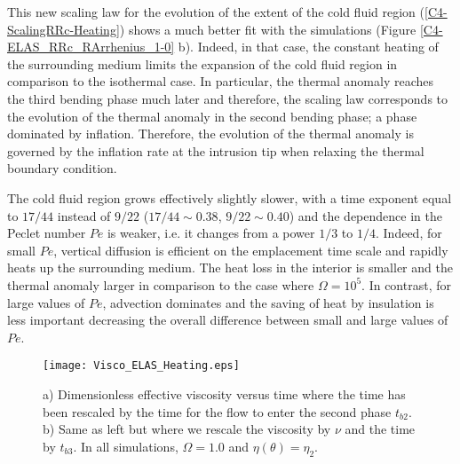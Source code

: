 This new scaling law for the evolution of the extent of the cold fluid
region (\ref{C4-ScalingRRc-Heating}) shows a  much better fit with the
simulations  (Figure \ref{C4-ELAS_RRc_RArrhenius_1-0}  b). Indeed,  in
that case, the  constant heating of the surrounding  medium limits the
expansion of  the cold  fluid region in  comparison to  the isothermal
case. In  particular, the  thermal anomaly  reaches the  third bending
phase much  later and  therefore, the scaling  law corresponds  to the
evolution of the thermal anomaly in  the second bending phase; a phase
dominated  by  inflation.  Therefore,  the  evolution  of the  thermal
anomaly is  governed by the inflation  rate at the intrusion  tip when
relaxing the thermal boundary condition.

The cold fluid  region grows effectively slightly slower,  with a time
exponent  equal  to $17/44$  instead  of  $9/22$ ($17/44  \sim  0.38$,
$9/22\sim  0.40$) and  the dependence  in  the Peclet  number $Pe$  is
weaker, i.e.   it changes from  a power  $1/3$ to $1/4$.   Indeed, for
small $Pe$,  vertical diffusion is  efficient on the  emplacement time
scale and  rapidly heats up the  surrounding medium. The heat  loss in
the interior is  smaller and the thermal anomaly  larger in comparison
to the  case where $\Omega= 10^5$.   In contrast, for large  values of
$Pe$, advection dominates and the saving of heat by insulation is less
important decreasing  the overall  difference between small  and large
values of $Pe$.

\begin{figure}[h!]
  \begin{center}
    \graphicspath{ {/Users/thorey/Documents/These/Projet/Refroidissement/Skin_Model/Figure/Figure_Heating/} }
    \texttt{[image: Visco\_ELAS\_Heating.eps]}
    \caption{a)  Dimensionless effective  viscosity versus  time where
      the time has been rescaled by the time for the flow to enter the
      second phase $t_{b2}$. b) Same as  left but where we rescale the
      viscosity by $\nu$ and the time by $t_{b3}$. In all simulations,
      $\Omega=1.0$ and $\eta(\theta)=\eta_2$.}
    \label{C4-Visco_ELAS_Heating}
  \end{center}
\end{figure}

